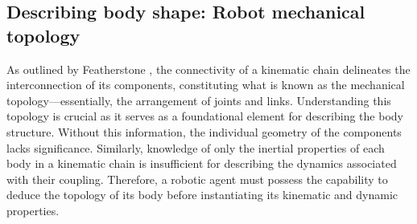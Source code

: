 
\subsection{Describing body shape: Robot mechanical topology}

As outlined by Featherstone \cite{Featherstone2007RigidBodyDynamics}, the connectivity of a kinematic chain delineates the interconnection of its components, constituting what is known as the mechanical topology---essentially, the arrangement of joints and links. Understanding this topology is crucial as it serves as a foundational element for describing the body structure. Without this information, the individual geometry of the components lacks significance. Similarly, knowledge of only the inertial properties of each body in a kinematic chain is insufficient for describing the dynamics associated with their coupling. Therefore, a robotic agent must possess the capability to deduce the topology of its body before instantiating its kinematic and dynamic properties.

